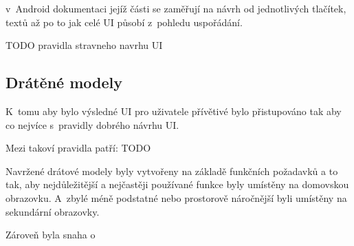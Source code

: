 v~Android dokumentaci jejíž části se zaměřují na návrh od jednotlivých tlačítek, textů až po to jak celé UI působí z~pohledu
uspořádání.



TODO pravidla stravneho navrhu UI

\subsection{Drátěné modely} \label{navrhWireframes}
K~tomu aby bylo výsledné UI pro uživatele přívětivé bylo přistupováno tak aby co nejvíce  s~pravidly dobrého návrhu UI.

Mezi takoví pravidla patří:
TODO

Navržené drátové modely byly vytvořeny na základě funkčních požadavků a to tak, aby nejdůležitější a nejčastěji používané funkce byly 
umístěny na domovskou obrazovku. A~zbylé méně podstatné nebo prostorově náročnější byli umístěny na sekundární obrazovky.

Zároveň byla snaha o 


